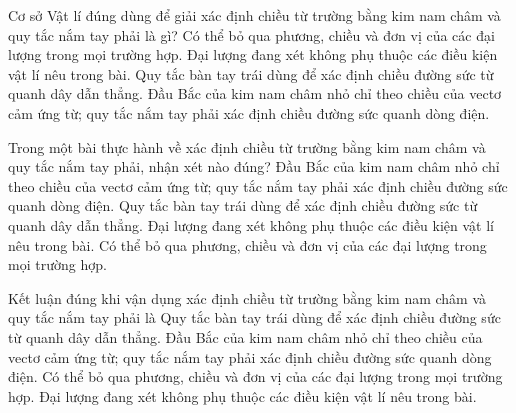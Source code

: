 \begin{ex}
Cơ sở Vật lí đúng dùng để giải xác định chiều từ trường bằng kim nam châm và quy tắc nắm tay phải là gì?
\choice
{Có thể bỏ qua phương, chiều và đơn vị của các đại lượng trong mọi trường hợp.}
{Đại lượng đang xét không phụ thuộc các điều kiện vật lí nêu trong bài.}
{Quy tắc bàn tay trái dùng để xác định chiều đường sức từ quanh dây dẫn thẳng.}
{\True Đầu Bắc của kim nam châm nhỏ chỉ theo chiều của vectơ cảm ứng từ; quy tắc nắm tay phải xác định chiều đường sức quanh dòng điện.}
\end{ex}

\begin{ex}
Trong một bài thực hành về xác định chiều từ trường bằng kim nam châm và quy tắc nắm tay phải, nhận xét nào đúng?
\choice
{\True Đầu Bắc của kim nam châm nhỏ chỉ theo chiều của vectơ cảm ứng từ; quy tắc nắm tay phải xác định chiều đường sức quanh dòng điện.}
{Quy tắc bàn tay trái dùng để xác định chiều đường sức từ quanh dây dẫn thẳng.}
{Đại lượng đang xét không phụ thuộc các điều kiện vật lí nêu trong bài.}
{Có thể bỏ qua phương, chiều và đơn vị của các đại lượng trong mọi trường hợp.}
\end{ex}

\begin{ex}
Kết luận đúng khi vận dụng xác định chiều từ trường bằng kim nam châm và quy tắc nắm tay phải là
\choice
{Quy tắc bàn tay trái dùng để xác định chiều đường sức từ quanh dây dẫn thẳng.}
{\True Đầu Bắc của kim nam châm nhỏ chỉ theo chiều của vectơ cảm ứng từ; quy tắc nắm tay phải xác định chiều đường sức quanh dòng điện.}
{Có thể bỏ qua phương, chiều và đơn vị của các đại lượng trong mọi trường hợp.}
{Đại lượng đang xét không phụ thuộc các điều kiện vật lí nêu trong bài.}
\end{ex}

